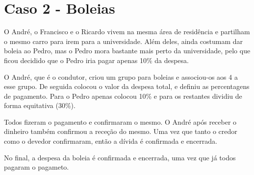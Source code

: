 \section{Caso 2 - Boleias}

O André, o Francisco e o Ricardo vivem na mesma área de residência e partilham o mesmo carro para irem para a universidade. Além deles, ainda costumam dar boleia ao Pedro, mas o Pedro mora bastante mais perto da universidade, pelo que ficou decidido que o Pedro iria pagar apenas 10\% da despesa.

O André, que é o condutor, criou um grupo para boleias e associou-os aos 4 a esse grupo. De seguida colocou o valor da despesa total, e definiu as percentagens de pagamento. Para o Pedro apenas colocou 10\% e para os restantes dividiu de forma equitativa (30\%).

Todos fizeram o pagamento e confirmaram o mesmo. O André após receber o dinheiro também confirmou a receção do mesmo. Uma vez que tanto o credor como o devedor confirmaram, então a dívida é confirmada e encerrada.

No final, a despesa da boleia é confirmada e encerrada, uma vez que já todos pagaram o pagameto.